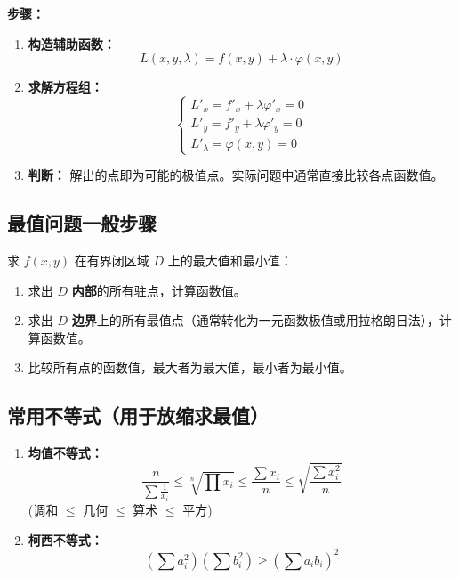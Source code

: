 \documentclass[a4paper,12pt]{ctexart}
\begin{document}
\textbf{步骤：}
\begin{enumerate}
    \item \textbf{构造辅助函数：}
    \[ L(x,y,\lambda) = f(x,y) + \lambda \cdot \varphi(x,y) \]
    \item \textbf{求解方程组：}
    \[ \begin{cases} L'_x = f'_x + \lambda \varphi'_x = 0 \\ L'_y = f'_y + \lambda \varphi'_y = 0 \\ L'_\lambda = \varphi(x,y) = 0 \end{cases} \]
    \item \textbf{判断：} 解出的点即为可能的极值点。实际问题中通常直接比较各点函数值。
\end{enumerate}

\subsection{最值问题一般步骤}
求 $f(x,y)$ 在有界闭区域 $D$ 上的最大值和最小值：
\begin{enumerate}
    \item 求出 $D$ \textbf{内部}的所有驻点，计算函数值。
    \item 求出 $D$ \textbf{边界}上的所有最值点（通常转化为一元函数极值或用拉格朗日法），计算函数值。
    \item 比较所有点的函数值，最大者为最大值，最小者为最小值。
\end{enumerate}

\subsection{常用不等式（用于放缩求最值）}
\begin{enumerate}
    \item \textbf{均值不等式：}
    \[ \frac{n}{\sum \frac{1}{x_i}} \le \sqrt[n]{\prod x_i} \le \frac{\sum x_i}{n} \le \sqrt{\frac{\sum x_i^2}{n}} \]
    (调和 $\le$ 几何 $\le$ 算术 $\le$ 平方)
    \item \textbf{柯西不等式：}
    \[ (\sum a_i^2)(\sum b_i^2) \ge (\sum a_i b_i)^2 \]
\end{enumerate}
\end{document}
